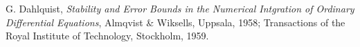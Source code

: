 \begin{thebibliography}{HNW00}


 G. Dahlquist, \emph{Stability and Error Bounds in the Numerical Intgration
   of Ordinary Differential Equations}, Almqvist \& Wiksells,
   Uppsala, 1958; Transactions of the Royal Institute of
   Technology, Stockholm, 1959.















\end{thebibliography}
